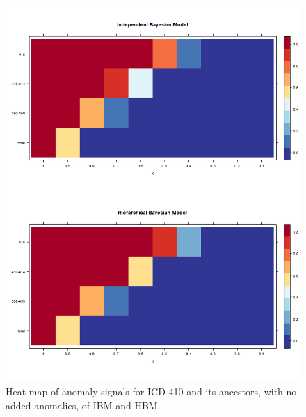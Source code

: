 \newpage%

\begin{figure}[!h]
	\centering
	\includegraphics[width=1\linewidth]{../../R-codes/JAGS/plots/mimic/heat410}
	\caption{Heat-map of anomaly signals for ICD 410 and its ancestors, with no added anomalies, of IBM and HBM.}
	\label{fig:heat410}
\end{figure}

\newpage

